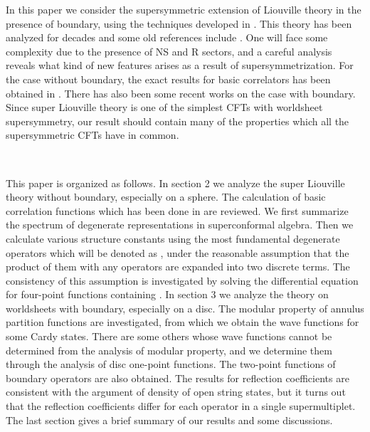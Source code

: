 \documentclass[a4paper,12pt]{article}
\providecommand{\ep}{{\epsilon}}
\providecommand{\bep}{{\bar{\epsilon}}}
\begin{document}
   In this paper we consider the \coordHE{} supersymmetric extension
 of Liouville theory in the presence of boundary,
 using the techniques developed in \cite{FZZ,ZZ}.
 This theory has been analyzed for decades and some old references
 include \cite{Arvis,DHoker,Babelon,ZP,ACDH,dFK,AD,DA}.
 One will face some complexity due to the presence of
 NS and R sectors, and a careful analysis reveals
 what kind of new features arises as a result
 of supersymmetrization.
 For the case without boundary, the exact results for basic correlators
 has been obtained in \cite{Poghosian, RS}.
 There has also been some recent works on the case with boundary\cite{ARS}.
 Since super Liouville theory is one of the simplest CFTs
 with \coordHE{} worldsheet supersymmetry, our result should contain
 many of the properties which all the \coordHE{} supersymmetric
 CFTs have in common.

~

   This paper is organized as follows.
 In section 2 we analyze the \coordHE{} super Liouville theory without
 boundary, especially on a sphere.
 The calculation of basic correlation functions which has been done
 in  \cite{Poghosian,RS} are reviewed.
 We first summarize the spectrum of degenerate representations
 in \coordHE{} superconformal algebra.
 Then we calculate various structure constants using the most
 fundamental degenerate operators which will be denoted as
 \myHighlight{$\Theta_{-b/2}^{\ep\bep}$}\coordHE{}, under the reasonable assumption
 that the product of them with any operators are expanded
 into two discrete terms.
 The consistency of this assumption is investigated by solving
 the differential equation for four-point functions containing
 \myHighlight{$\Theta_{-b/2}^{\ep\bep}$}\coordHE{}.
 In section 3 we analyze the theory on worldsheets with boundary,
 especially on a disc.
 The modular property of annulus partition functions are investigated,
 from which we obtain the wave functions for some Cardy states.
 There are some others whose wave functions cannot be determined from
 the analysis of modular property, and we determine them
 through the analysis of disc one-point functions.
 The two-point functions of boundary operators are also obtained.
 The results for reflection coefficients are consistent with the 
 argument of density of open string states, but it turns out
 that the reflection coefficients differ for each operator in a
 single supermultiplet.
 The last section gives a brief summary of our results and some
 discussions.
\end{document}
